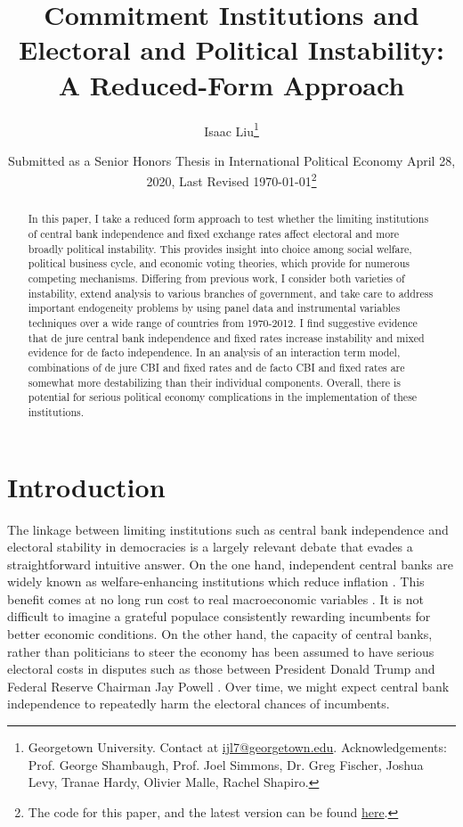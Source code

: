 \documentclass{article}
\title{Commitment Institutions and Electoral and Political Instability: A Reduced-Form Approach}
\author{Isaac Liu\thanks{Georgetown University. Contact at \href{mailto:ijl7@georgetown.edu}{ijl7@georgetown.edu}. Acknowledgements: Prof. George Shambaugh, Prof. Joel Simmons, Dr. Greg Fischer, Joshua Levy, Tranae Hardy, Olivier Malle, Rachel Shapiro.}}
\date{Submitted as a Senior Honors Thesis in International Political Economy April 28, 2020, \newline Last Revised \today \footnote{The code for this paper, and the latest version can be found \href{https://github.com/ijyliu/Commitment_Institutions_Instability}{here}.}}
\begin{document}
	\maketitle

    \begin{abstract}
        In this paper, I take a reduced form approach to test whether the limiting institutions of central bank independence and fixed exchange rates affect electoral and more broadly political instability. This provides insight into choice among social welfare, political business cycle, and economic voting theories, which provide for numerous competing mechanisms. Differing from previous work, I consider both varieties of instability, extend analysis to various branches of government, and take care to address important endogeneity problems by using panel data and instrumental variables techniques over a wide range of countries from 1970-2012. I find suggestive evidence that de jure central bank independence and fixed rates increase instability and mixed evidence for de facto independence. In an analysis of an interaction term model, combinations of de jure CBI and fixed rates and de facto CBI and fixed rates are somewhat more destabilizing than their individual components. Overall, there is potential for serious political economy complications in the implementation of these institutions.
    \end{abstract}

    \clearpage
    \newpage

    \section*{Introduction}

    The linkage between limiting institutions such as central bank independence and electoral stability in democracies is a largely relevant debate that evades a straightforward intuitive answer. On the one hand, independent central banks are widely known as welfare-enhancing institutions which reduce inflation \citep{chicago_booth_initiative_on_global_markets_fed_2019}. This benefit comes at no long run cost to real macroeconomic variables \citep{alesina_political_1997}. It is not difficult to imagine a grateful populace consistently rewarding incumbents for better economic conditions. On the other hand, the capacity of central banks, rather than politicians to steer the economy has been assumed to have serious electoral costs in disputes such as those between President Donald Trump and Federal Reserve Chairman Jay Powell \citep{long_federal_2019}. Over time, we might expect central bank independence to repeatedly harm the electoral chances of incumbents.
\end{document}
